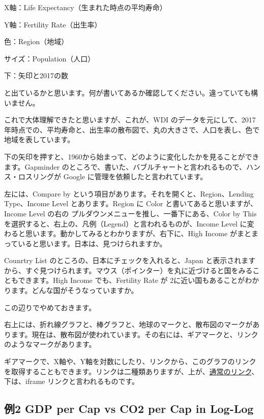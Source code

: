 \documentclass[
  xelatex, ja=standard]{bxjsbook}
\theoremstyle{definition}
\theoremstyle{definition}
\theoremstyle{definition}
\theoremstyle{definition}
\theoremstyle{remark}
\begin{document}
X軸：Life Expectancy（生まれた時点の平均寿命）

Y軸：Fertility Rate（出生率）

色：Region（地域）

サイズ：Population（人口）

下：矢印と2017の数

と出ているかと思います。何が書いてあるか確認してください。違っていても構いません。

これで大体理解できたと思いますが、これが、WDI のデータを元にして、2017年時点での、平均寿命と、出生率の散布図で、丸の大きさで、人口を表し、色で地域を表しています。

下の矢印を押すと、1960から始まって、どのように変化したかを見ることができます。Gapminder のところで、書いた、バブルチャートと言われるもので、ハンス・ロスリングが Google に管理を依頼したと言われています。

左には、Compare by という項目があります。それを開くと、Region、Lending Type、Income Level とあります。Region に Color と書いてあると思いますが、Income Level の右の プルダウンメニューを推し、一番下にある、Color by This を選択すると、右上の、凡例（Legend）と言われるものが、Income Level に変わると思います。動かしてみるとわかりますが、右下に、High Income がまとまっていると思います。日本は、見つけられますか。

Counrtry List のところの、日本にチェックを入れると、Japan と表示されますから、すぐ見つけられます。マウス（ポインター）を丸に近づけると国をみることもできます。High Income でも、Fertility Rate が 2に近い国もあることがわかります。どんな国がそうなっていますか。

この辺りでやめておきます。

右上には、折れ線グラフと、棒グラフと、地球のマークと、散布図のマークがあります。現在は、散布図が使われています。その右には、ギアマークと、リンクのようなマークがあります。

ギアマークで、X軸や、Y軸を対数にしたり、リンクから、このグラフのリンクを取得することもできます。リンクは二種類ありますが、上が、\href{https://www.google.com/publicdata/explore?ds=d5bncppjof8f9_\&ctype=b\&strail=false\&bcs=d\&nselm=s\&met_x=sp_dyn_le00_in\&scale_x=lin\&ind_x=false\&met_y=sp_dyn_tfrt_in\&scale_y=lin\&ind_y=false\&met_s=sp_pop_totl\&scale_s=lin\&ind_s=false\&dimp_c=country:income_level\&idim=country:JPN\&ifdim=country\&tunit=Y\&pit=1504623600000\&hl=en_US\&dl=en_US\&ind=false\&icfg\&iconSize=0.5}{通常のリンク}、下は、iframe リンクと言われるものです。

\hypertarget{ux4f8b2-gdp-per-cap-vs-co2-per-cap-in-log-log}{%
\subsection{例2 GDP per Cap vs CO2 per Cap in Log-Log}\label{ux4f8b2-gdp-per-cap-vs-co2-per-cap-in-log-log}}
\end{document}
